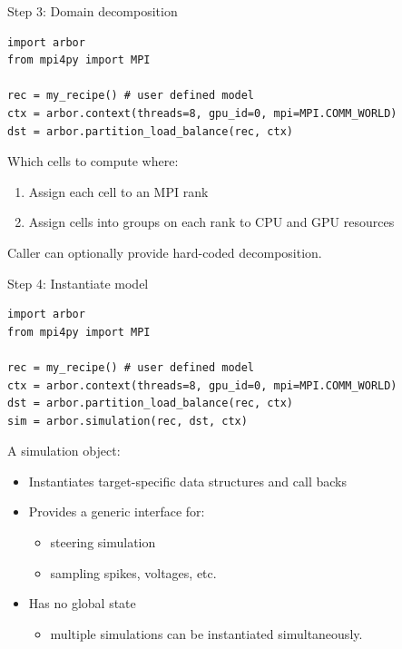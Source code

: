 \documentclass[aspectratio=43]{beamer}
\begin{document}
\begin{frame}[fragile]{Step 3: Domain decomposition}
        \begin{lstlisting}[style=talkpython]
import arbor
from mpi4py import MPI

rec = my_recipe() # user defined model
ctx = arbor.context(threads=8, gpu_id=0, mpi=MPI.COMM_WORLD)
dst = arbor.partition_load_balance(rec, ctx)
        \end{lstlisting}

    \vspace{10pt}

    Which cells to compute where:
    \begin{enumerate}
        \item Assign each cell to an MPI rank
        \item Assign cells into groups on each rank to CPU and GPU resources
    \end{enumerate}

    \vspace{10pt}

    Caller can optionally provide hard-coded decomposition.

    \vfill
\end{frame}

\begin{frame}[fragile]{Step 4: Instantiate model}
        \begin{lstlisting}[style=talkpython]
import arbor
from mpi4py import MPI

rec = my_recipe() # user defined model
ctx = arbor.context(threads=8, gpu_id=0, mpi=MPI.COMM_WORLD)
dst = arbor.partition_load_balance(rec, ctx)
sim = arbor.simulation(rec, dst, ctx)
        \end{lstlisting}

    A simulation object:
    \begin{itemize}
        \item Instantiates target-specific data structures and call backs
        \item Provides a generic interface for:
        \begin{itemize}
            \item steering simulation
            \item sampling spikes, voltages, etc.
        \end{itemize}
        \item Has no global state
        \begin{itemize}
            \item multiple simulations can be instantiated simultaneously.
        \end{itemize}
    \end{itemize}

    \vfill
\end{frame}
\end{document}
